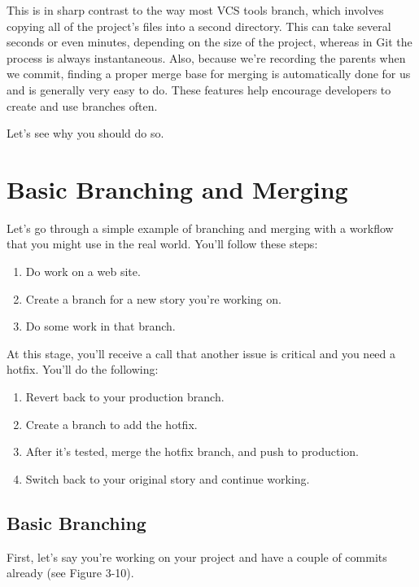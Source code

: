 \documentclass[a4paper]{book}
\begin{document}
This is in sharp contrast to the way most VCS tools branch, which involves copying all of the project's files into a second directory. This can take several seconds or even minutes, depending on the size of the project, whereas in Git the process is always instantaneous. Also, because we're recording the parents when we commit, finding a proper merge base for merging is automatically done for us and is generally very easy to do. These features help encourage developers to create and use branches often.

Let's see why you should do so.

\section{Basic Branching and Merging}

Let's go through a simple example of branching and merging with a workflow that you might use in the real world. You'll follow these steps:

\begin{enumerate}
\def\labelenumi{\arabic{enumi}.}
\itemsep1pt\parskip0pt
\item
  Do work on a web site.
\item
  Create a branch for a new story you're working on.
\item
  Do some work in that branch.
\end{enumerate}

At this stage, you'll receive a call that another issue is critical and you need a hotfix. You'll do the following:

\begin{enumerate}
\def\labelenumi{\arabic{enumi}.}
\itemsep1pt\parskip0pt
\item
  Revert back to your production branch.
\item
  Create a branch to add the hotfix.
\item
  After it's tested, merge the hotfix branch, and push to production.
\item
  Switch back to your original story and continue working.
\end{enumerate}

\subsection{Basic Branching}

First, let's say you're working on your project and have a couple of commits already (see Figure 3-10).
\end{document}
